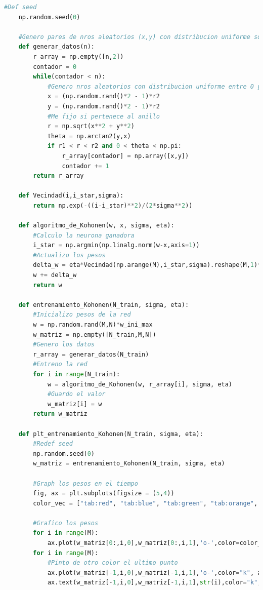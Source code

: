 \documentclass[aps,prb,twocolumn,superscriptaddress,floatfix,longbibliography]{revtex4-2}
\begin{document}
\begin{lstlisting}[language=Python]
    #Def seed
    np.random.seed(0)
    
    #Genero pares de nros aleatorios (x,y) con distribucion uniforme sobre un circulo
    def generar_datos(n):
        r_array = np.empty([n,2])
        contador = 0
        while(contador < n):
            #Genero nros aleatorios con distribucion uniforme entre 0 y 1
            x = (np.random.rand()*2 - 1)*r2
            y = (np.random.rand()*2 - 1)*r2
            #Me fijo si pertenece al anillo
            r = np.sqrt(x**2 + y**2)
            theta = np.arctan2(y,x)
            if r1 < r < r2 and 0 < theta < np.pi:
                r_array[contador] = np.array([x,y])
                contador += 1
        return r_array
    
    def Vecindad(i,i_star,sigma):
        return np.exp(-((i-i_star)**2)/(2*sigma**2))
    
    def algoritmo_de_Kohonen(w, x, sigma, eta):
        #Calculo la neurona ganadora
        i_star = np.argmin(np.linalg.norm(w-x,axis=1))
        #Actualizo los pesos
        delta_w = eta*Vecindad(np.arange(M),i_star,sigma).reshape(M,1)*(x-w)
        w += delta_w
        return w
    
    def entrenamiento_Kohonen(N_train, sigma, eta):
        #Inicializo pesos de la red
        w = np.random.rand(M,N)*w_ini_max
        w_matriz = np.empty([N_train,M,N])
        #Genero los datos
        r_array = generar_datos(N_train)
        #Entreno la red
        for i in range(N_train):
            w = algoritmo_de_Kohonen(w, r_array[i], sigma, eta)
            #Guardo el valor
            w_matriz[i] = w
        return w_matriz
    
    def plt_entrenamiento_Kohonen(N_train, sigma, eta):
        #Redef seed
        np.random.seed(0)
        w_matriz = entrenamiento_Kohonen(N_train, sigma, eta)
    
        #Graph los pesos en el tiempo
        fig, ax = plt.subplots(figsize = (5,4))
        color_vec = ["tab:red", "tab:blue", "tab:green", "tab:orange", "tab:purple", "tab:brown", "tab:pink", "tab:gray", "tab:olive", "tab:cyan"]
    
        #Grafico los pesos
        for i in range(M):
            ax.plot(w_matriz[0:,i,0],w_matriz[0:,i,1],'o-',color=color_vec[i], alpha = 0.1)
        for i in range(M):
            #Pinto de otro color el ultimo punto
            ax.plot(w_matriz[-1,i,0],w_matriz[-1,i,1],'o-',color="k", alpha = 1)
            ax.text(w_matriz[-1,i,0],w_matriz[-1,i,1],str(i),color="k",alpha=1)
    

\end{lstlisting}
\end{document}
